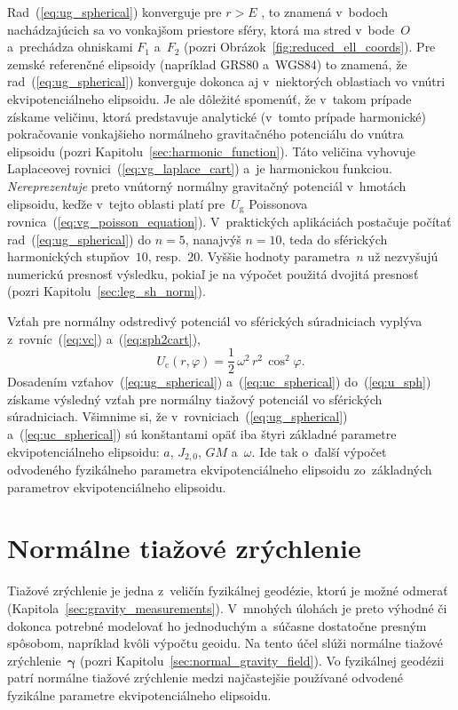 \documentclass[a4paper, 12pt]{book}
\newcommand{\gidx}{\mathrm g}
\newcommand{\cidx}{\mathrm c}
\begin{document}
Rad~(\ref{eq:ug_spherical}) konverguje pre $r > E$ 
\parencite{MoritzAdvancedGeodesy}, to znamená v~bodoch nachádzajúcich sa vo 
vonkajšom priestore sféry, ktorá ma stred v~bode~$O$ a~prechádza ohniskami 
$F_1$ a~$F_2$ (pozri Obrázok~\ref{fig:reduced_ell_coords}).  Pre zemské 
referenčné elipsoidy (napríklad GRS80 a~WGS84) to znamená, že 
rad~(\ref{eq:ug_spherical}) konverguje dokonca aj v~niektorých oblastiach vo 
vnútri ekvipotenciálneho elipsoidu.  Je ale dôležité spomenúť, že v~takom 
prípade získame veličinu, ktorá predstavuje analytické (v~tomto prípade 
harmonické) pokračovanie vonkajšieho normálneho gravitačného potenciálu do 
vnútra elipsoidu (pozri Kapitolu~\ref{sec:harmonic_function}).  Táto veličina 
vyhovuje Laplaceovej rovnici~(\ref{eq:vg_laplace_cart}) a~je harmonickou 
funkciou.  \emph{Nereprezentuje} preto vnútorný normálny gravitačný potenciál 
v~hmotách elipsoidu, keďže v~tejto oblasti platí pre~$U_\gidx$ Poissonova 
rovnica~(\ref{eq:vg_poisson_equation}).  V~praktických aplikáciách postačuje 
počítať rad~(\ref{eq:ug_spherical}) do $n = 5$, nanajvýš $n = 10$, teda do 
sférických harmonických stupňov~$10$, resp.~$20$.  Vyššie hodnoty parametra~$n$ 
už nezvyšujú numerickú presnosť výsledku, pokiaľ je na výpočet použitá dvojitá 
presnosť (pozri Kapitolu~\ref{sec:leg_sh_norm}).

Vzťah pre normálny odstredivý potenciál vo sférických súradniciach vyplýva 
z~rovníc~(\ref{eq:vc}) a~(\ref{eq:sph2cart}),
%
\begin{equation}
\label{eq:uc_spherical}
U_\cidx(r, \varphi) = \frac{1}{2} \, \omega^2 \, r^2 \, \cos^2\varphi{.}
\end{equation}
%
Dosadením vzťahov~(\ref{eq:ug_spherical}) a~(\ref{eq:uc_spherical}) 
do~(\ref{eq:u_sph}) získame výsledný vzťah pre normálny tiažový potenciál vo 
sférických súradniciach.  Všimnime si, že v~rovniciach~(\ref{eq:ug_spherical}) 
a~(\ref{eq:uc_spherical}) sú konštantami opäť iba štyri základné parametre 
ekvipotenciálneho elipsoidu: $a$, $J_{2,0}$, $GM$ a~$\omega$.  Ide tak o~ďalší 
výpočet odvodeného fyzikálneho parametra ekvipotenciálneho elipsoidu 
zo~základných parametrov ekvipotenciálneho elipsoidu.



\section{Normálne tiažové zrýchlenie}
\label{sec:normal_gravity}

Tiažové zrýchlenie je jedna z~veličín fyzikálnej geodézie, ktorú je možné 
odmerať (Kapitola~\ref{sec:gravity_measurements}).  V~mnohých úlohách je preto 
výhodné či dokonca potrebné modelovať ho jednoduchým a~súčasne dostatočne 
presným spôsobom, napríklad kvôli výpočtu geoidu.  Na tento účel slúži normálne 
tiažové zrýchlenie~$\boldsymbol\gamma$ (pozri 
Kapitolu~\ref{sec:normal_gravity_field}).  Vo fyzikálnej geodézii patrí 
normálne tiažové zrýchlenie medzi najčastejšie používané odvodené fyzikálne 
parametre ekvipotenciálneho elipsoidu.
\end{document}
